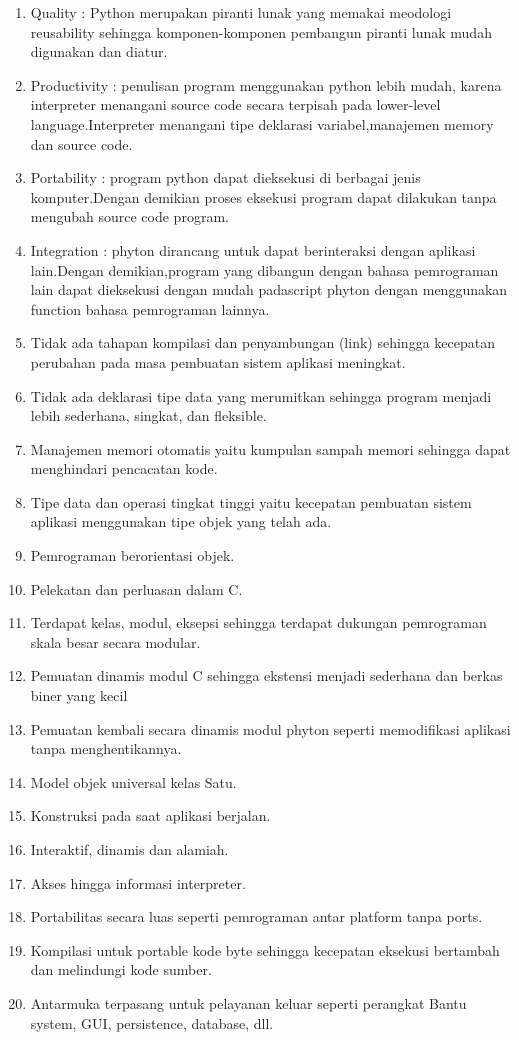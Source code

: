 \begin{enumerate}
\item Quality : Python merupakan piranti lunak yang memakai meodologi reusability sehingga komponen-komponen pembangun piranti      lunak mudah digunakan dan diatur.
\item Productivity : penulisan program menggunakan python lebih mudah, karena interpreter menangani source code secara terpisah pada lower-level language.Interpreter menangani tipe deklarasi variabel,manajemen memory dan source code.
\item Portability : program python dapat dieksekusi di berbagai jenis komputer.Dengan demikian proses eksekusi program dapat dilakukan tanpa mengubah source code program.
\item Integration : phyton dirancang untuk dapat berinteraksi dengan aplikasi lain.Dengan demikian,program yang dibangun dengan bahasa pemrograman lain dapat dieksekusi dengan mudah padascript phyton dengan menggunakan function bahasa pemrograman lainnya.
\item Tidak ada tahapan kompilasi dan penyambungan (link) sehingga kecepatan perubahan pada masa pembuatan sistem aplikasi meningkat.
\item Tidak ada deklarasi tipe data yang merumitkan sehingga program menjadi lebih sederhana, singkat, dan fleksible.
\item Manajemen memori otomatis yaitu kumpulan sampah memori sehingga dapat menghindari pencacatan kode.
\item Tipe data dan operasi tingkat tinggi yaitu kecepatan pembuatan sistem aplikasi menggunakan tipe objek yang telah ada.
\item Pemrograman berorientasi objek.
\item Pelekatan dan perluasan dalam C.
\item Terdapat kelas, modul, eksepsi sehingga terdapat dukungan pemrograman skala besar secara modular.
\item Pemuatan dinamis modul C sehingga ekstensi menjadi sederhana dan berkas biner yang kecil
\item Pemuatan kembali secara dinamis modul phyton seperti memodifikasi aplikasi tanpa menghentikannya.
\item Model objek universal kelas Satu.
\item Konstruksi pada saat aplikasi berjalan.
\item Interaktif, dinamis dan alamiah.
\item Akses hingga informasi interpreter.
\item Portabilitas secara luas seperti pemrograman antar platform tanpa ports.
\item Kompilasi untuk portable kode byte sehingga kecepatan eksekusi bertambah dan melindungi kode sumber.
\item Antarmuka terpasang untuk pelayanan keluar seperti perangkat Bantu system, GUI, persistence, database, dll.
\end{enumerate}
 
